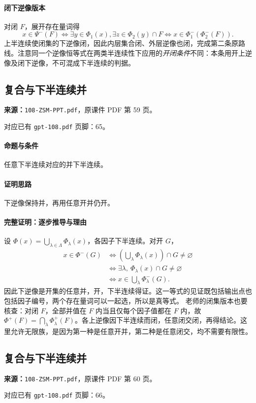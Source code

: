 \paragraph{闭下逆像版本}对闭 $F$，展开存在量词得
\[x\in\Psi^-(F)\iff\exists y\in\Phi_1(x),\exists z\in\Phi_2(y)\cap F\iff x\in\Phi_1^-(\Phi_2^-(F)).\]
上半连续使闭集的下逆像闭，因此内层集合闭、外层逆像也闭，完成第二条原路线。注意同一个逆像恒等式在两类半连续性下应用的\emph{开闭条件}不同：本条用开上逆像及闭下逆像，不可混成下半连续的判据。

\clearpage\subsection{复合与下半连续并}
\textbf{来源：}\texttt{108-ZSM-PPT.pdf}，原课件 PDF 第 59 页。\par
对应已有 \texttt{gpt-108.pdf} 页脚：65。\par
\paragraph{命题与条件}任意下半连续对应的并下半连续。
\paragraph{证明思路}下逆像保持并，再用任意开并仍开。
\paragraph{完整证明：逐步推导与理由}

设 $\Phi(x)=\bigcup_{\lambda\in\Lambda}\Phi_\lambda(x)$，各因子下半连续。对开 $G$，
\begin{align*}
x\in\Phi^-(G)&\iff\left(\bigcup_\lambda\Phi_\lambda(x)\right)\cap G\ne\varnothing\\
&\iff\exists\lambda,\ \Phi_\lambda(x)\cap G\ne\varnothing\\
&\iff x\in\bigcup_\lambda\Phi_\lambda^-(G).
\end{align*}
因此下逆像是开集的任意并，开，下半连续得证。这一等式的见证既包括输出点也包括因子编号，两个存在量词可以一起选，所以是真等式。
老师的闭集版本也要核查：对闭 $F$，全部并值在 $F$ 内当且仅每个因子值都在 $F$ 内，故 $\Phi^+(F)=\bigcap_\lambda\Phi_\lambda^+(F)$。各上逆像因下半连续而闭，任意闭交闭，再得结论。这里允许无限族，是因为第一种是任意开并，第二种是任意闭交，均不需要有限性。

\clearpage\subsection{复合与下半连续并}
\textbf{来源：}\texttt{108-ZSM-PPT.pdf}，原课件 PDF 第 60 页。\par
对应已有 \texttt{gpt-108.pdf} 页脚：66。\par
